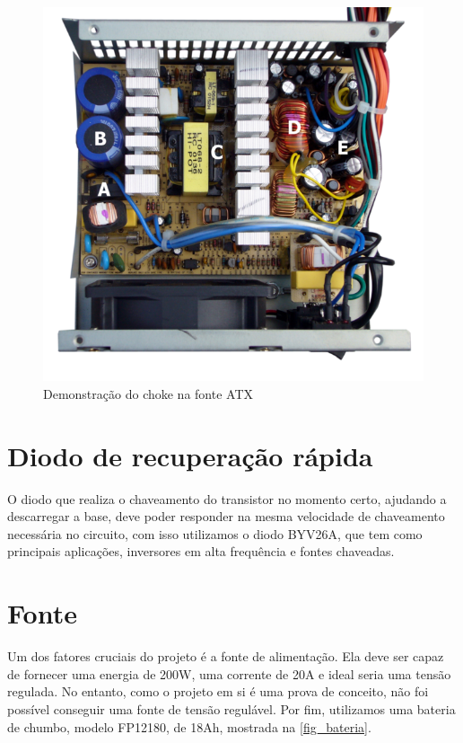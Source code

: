 \begin{figure}[htb]
\caption{\label{fig_fonte-atx}Demonstração do choke na fonte ATX}
\begin{center}
\includegraphics[scale=0.5]{images/fonte-atx.png}
\end{center}
\end{figure}


\section{Diodo de recuperação rápida}
O diodo que realiza o chaveamento do transistor no momento certo, ajudando a descarregar a base, deve poder responder na mesma velocidade de chaveamento necessária no circuito, com isso utilizamos o diodo BYV26A, que tem como principais aplicações, inversores em alta frequência e fontes chaveadas.
\section{Fonte}
Um dos fatores cruciais do projeto é a fonte de alimentação. Ela deve ser capaz de fornecer uma energia de 200W, uma corrente de 20A e ideal seria uma tensão regulada. No entanto, como o projeto em si é uma prova de conceito, não foi possível conseguir uma fonte de tensão regulável. Por fim, utilizamos uma bateria de chumbo, modelo FP12180, de 18Ah, mostrada na \autoref{fig_bateria}.

